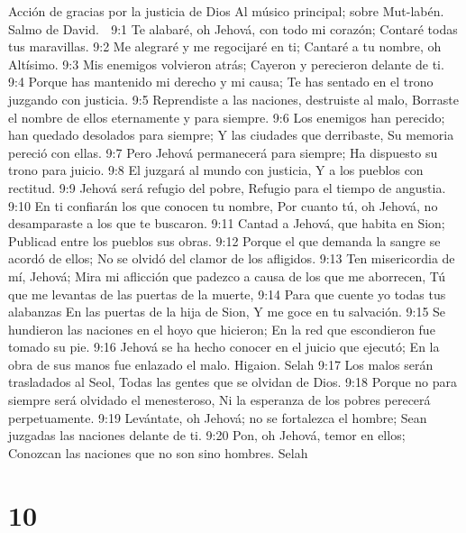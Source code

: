 Acción de gracias por la justicia de Dios 
Al músico principal; sobre Mut-labén. Salmo de David. 

9:1 Te alabaré, oh Jehová, con todo mi corazón; 
Contaré todas tus maravillas. 
9:2 Me alegraré y me regocijaré en ti; 
Cantaré a tu nombre, oh Altísimo. 
9:3 Mis enemigos volvieron atrás; 
Cayeron y perecieron delante de ti. 
9:4 Porque has mantenido mi derecho y mi causa; 
Te has sentado en el trono juzgando con justicia. 
9:5 Reprendiste a las naciones, destruiste al malo, 
Borraste el nombre de ellos eternamente y para siempre. 
9:6 Los enemigos han perecido; han quedado desolados para siempre; 
Y las ciudades que derribaste, 
Su memoria pereció con ellas. 
9:7 Pero Jehová permanecerá para siempre; 
Ha dispuesto su trono para juicio. 
9:8 El juzgará al mundo con justicia, 
Y a los pueblos con rectitud. 
9:9 Jehová será refugio del pobre, 
Refugio para el tiempo de angustia. 
9:10 En ti confiarán los que conocen tu nombre, 
Por cuanto tú, oh Jehová, no desamparaste a los que te buscaron. 
9:11 Cantad a Jehová, que habita en Sion; 
Publicad entre los pueblos sus obras. 
9:12 Porque el que demanda la sangre se acordó de ellos; 
No se olvidó del clamor de los afligidos. 
9:13 Ten misericordia de mí, Jehová; 
Mira mi aflicción que padezco a causa de los que me aborrecen, 
Tú que me levantas de las puertas de la muerte, 
9:14 Para que cuente yo todas tus alabanzas 
En las puertas de la hija de Sion, 
Y me goce en tu salvación. 
9:15 Se hundieron las naciones en el hoyo que hicieron; 
En la red que escondieron fue tomado su pie. 
9:16 Jehová se ha hecho conocer en el juicio que ejecutó; 
En la obra de sus manos fue enlazado el malo. Higaion. Selah 
9:17 Los malos serán trasladados al Seol, 
Todas las gentes que se olvidan de Dios. 
9:18 Porque no para siempre será olvidado el menesteroso, 
Ni la esperanza de los pobres perecerá perpetuamente. 
9:19 Levántate, oh Jehová; no se fortalezca el hombre; 
Sean juzgadas las naciones delante de ti. 
9:20 Pon, oh Jehová, temor en ellos; 
Conozcan las naciones que no son sino hombres. Selah 

\chapter{10}

